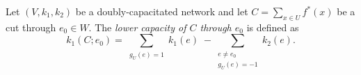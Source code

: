 Let $(V, k_1, k_2)$ be a doubly-capacitated network and let $C = \sum_{x \in U} f^*(x)$ be a cut through $e_0 \in W$. The \textit{lower capacity of $C$ through $e_0$} is defined as
$$k_1(C; e_0) = \sum_{\substack{g_U(e)=1}} k_1(e) \;-\!\!\! \sum_{\substack{e \neq e_0 \\ g_U(e)=-1}} k_2(e).$$
